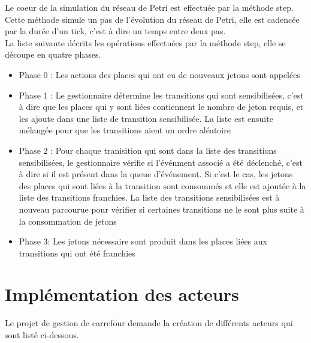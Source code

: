 \documentclass[11pt,a4paper, openany]{memoir}
\begin{document}
Le coeur de la simulation du réseau de Petri est effectuée par la méthode step. Cette méthode simule un pas de  l'évolution du réseau de Petri, elle est cadencée par la durée d'un tick, c'est à dire un temps entre deux pas.\\
La liste suivante décrits les opérations effectuées par la méthode step, elle se découpe en quatre phases.\\
\begin{itemize}
\item Phase 0 : Les actions des places qui ont eu de nouveaux jetons sont appelées
\item Phase 1 : Le gestionnaire détermine les transitions qui sont sensibilisées, c'est à dire que les places qui y sont liées contiennent le nombre de jeton requis, et les ajoute dans une liste de transition sensibilisée. La liste est ensuite mélangée pour que les transitions aient un ordre aléatoire
\item Phase 2 : Pour chaque tranisition qui sont dans la liste des transitions sensibilisées, le gestionnaire vérifie si l'événment associé a été déclenché, c'est à dire si il est présent dans la queue d'événement. Si c'est le cas, les jetons des places qui sont liées à la transition sont consommés et elle est ajoutée à la liste des transitions franchies. La liste des transitions sensibilisées est à nouveau parcourue pour vérifier si certaines transitions ne le sont plus suite à la consommation de jetons
\item Phase 3: Les jetons nécessaire sont produit dans les places liées aux transitions qui ont été franchies
\end{itemize}

\chapter{Implémentation des acteurs}

Le projet de gestion de carrefour demande la création de différents acteurs qui sont listé ci-dessous.\\
\end{document}
